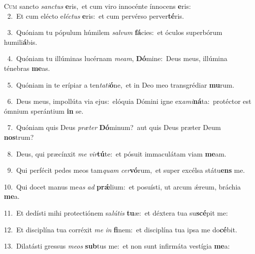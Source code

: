 \lettrine{\initial\textcolor{\initialcolor}{C}}{um} sancto \textit{sanc}\-\textit{tus} \textbf{e}\-ris,~\star et cum viro innocénte ínnocens \textbf{e}\-ris:\\
{\numbfont\textcolor{\numbcolor}{~2.}}~Et cum elécto e\-\textit{léc}\-\textit{tus} \textbf{e}\-ris:~\star et cum pervérso perver\-\textbf{té}\-ris.\par
{\numbfont\textcolor{\numbcolor}{~3.}}~Quóniam tu pópulum húmilem \textit{sal}\-\textit{vum} \textbf{fá}\-cies:~\star et óculos superbórum humili\-\textbf{á}\-bis.\par
{\numbfont\textcolor{\numbcolor}{~4.}}~Quóniam tu illúminas lucérnam \textit{me}\-\textit{am}, \textbf{Dó}\-mine:~\star Deus meus, illúmina ténebras \textbf{me}\-as.\par
{\numbfont\textcolor{\numbcolor}{~5.}}~Quóniam in te erípiar a ten\-\textit{ta}\-\textit{ti}\textbf{ó}ne,~\star et in Deo meo transgrédiar \textbf{mu}\-rum.\par
{\numbfont\textcolor{\numbcolor}{~6.}}~Deus meus, impollúta via ejus:~\dagger elóquia Dómini igne ex\-\textit{a}\-\textit{mi}\textbf{ná}ta:~\star protéctor est ómnium sperántium \textbf{in} se.\par
{\numbfont\textcolor{\numbcolor}{~7.}}~Quóniam quis Deus \textit{præ}\-\textit{ter} \textbf{Dó}\-minum?~\star aut quis Deus præter Deum \textbf{nos}\-trum?\par
{\numbfont\textcolor{\numbcolor}{~8.}}~Deus, qui præcínxit \textit{me} \textit{vir}\-\textbf{tú}te:~\star et pósuit immaculátam viam \textbf{me}\-am.\par
{\numbfont\textcolor{\numbcolor}{~9.}}~Qui perfécit pedes meos tam\textit{quam} \textit{cer}\-\textbf{vó}rum,~\star et super excélsa státu\textbf{ens} me.\par
{\numbfont\textcolor{\numbcolor}{10.}}~Qui docet manus me\textit{as} \textit{ad} \textbf{prǽ}\-lium:~\star et posuísti, ut arcum ǽreum, bráchia \textbf{me}\-a.\par
{\numbfont\textcolor{\numbcolor}{11.}}~Et dedísti mihi protectiónem sa\-\textit{lú}\-\textit{tis} \textbf{tu}\-æ:~\star et déxtera tua su\-\textbf{scé}\-pit me:\par
{\numbfont\textcolor{\numbcolor}{12.}}~Et disciplína tua corréxit \textit{me} \textit{in} \textbf{fi}\-nem:~\star et disciplína tua ipsa me do\-\textbf{cé}\-bit.\par
{\numbfont\textcolor{\numbcolor}{13.}}~Dilatásti gressus \textit{me}\-\textit{os} \textbf{sub}\-tus me:~\star et non sunt infirmáta vestígia \textbf{me}\-a:\par
